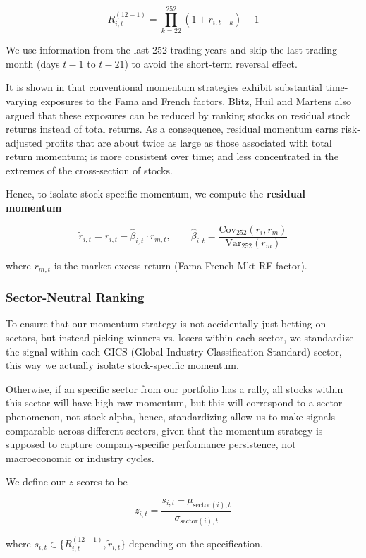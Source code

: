 \documentclass[12pt, a4paper]{article}
\begin{document}
	$$
	R_{i,t}^{(12-1)} = \prod_{k=22}^{252} (1 + r_{i,t-k}) - 1
	$$
	
	We use information from the last 252 trading years and skip the last trading month (days $t-1$ to $t-21$) to avoid the short-term reversal effect.
	
	It is shown in \cite{2} that conventional momentum strategies exhibit substantial time-varying exposures to the Fama and French factors.  Blitz, Huil and Martens also argued that these exposures can be reduced by ranking stocks on residual stock returns instead of total returns. As a consequence, residual momentum earns risk-adjusted profits that are about twice as large as those associated with total return momentum; is more consistent over time; and less concentrated in the extremes of the cross-section of stocks. 
	
	Hence, to isolate stock-specific momentum, we compute the \textbf{residual momentum}
	
	$$
	\tilde{r}_{i,t} = r_{i,t} - \hat{\beta}_{i,t} \cdot r_{m,t},
	\qquad
	\hat{\beta}_{i,t} = \frac{\text{Cov}_{252}(r_i, r_m)}{\text{Var}_{252}(r_m)}
	$$
	
	where $r_{m,t}$ is the market excess return (Fama-French Mkt-RF factor).
	
	\subsubsection{Sector-Neutral Ranking}
	
	To ensure that our momentum strategy is not accidentally just betting on sectors, but instead picking winners vs. losers within each sector, we standardize the signal within each GICS (Global Industry Classification Standard) sector, this way we actually isolate stock-specific momentum. 
	
	Otherwise, if an specific sector from our portfolio has a rally, all stocks within this sector will have high raw momentum, but this will correspond to a sector phenomenon, not stock alpha, hence, standardizing allow us to make signals comparable across different sectors,  given that the momentum strategy is supposed to capture company-specific performance persistence, not macroeconomic or industry cycles.
	
	We define our $z$-scores to be
	
	$$
	z_{i,t} = \frac{s_{i,t} - \mu_{\text{sector}(i),t}}{\sigma_{\text{sector}(i),t}}
	$$
	
	where $s_{i,t} \in \{ R_{i,t}^{(12-1)}, \tilde{r}_{i,t} \}$ depending on the specification.
	
\end{document}
